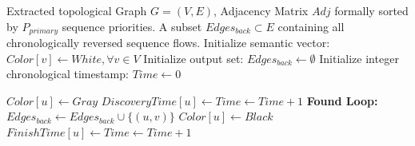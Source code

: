 \documentclass[fleqn,10pt]{wlscirep}
\begin{document}
\begin{algorithm}[H]
\caption{Algorithmic Topological State Vector Cycle Classification}
\begin{algorithmic}[1]
\Require Extracted topological Graph $G=(V, E)$, Adjacency Matrix $Adj$ formally sorted by $P_{primary}$ sequence priorities.
\Ensure A subset $Edges_{back} \subset E$ containing all chronologically reversed sequence flows.
\State Initialize semantic vector: $Color[v] \gets White, \forall v \in V$
\State Initialize output set: $Edges_{back} \gets \emptyset$
\State Initialize integer chronological timestamp: $Time \gets 0$

    \State $Color[u] \gets Gray$  
    \State $DiscoveryTime[u] \gets Time \gets Time + 1$
            \State \textbf{Found Loop:} 
            \State $Edges_{back} \gets Edges_{back} \cup \{(u, v)\}$ 
            \State {} 
        \EndIf
        \State {}
    \EndFor
    \State $Color[u] \gets Black$ 
    \State $FinishTime[u] \gets Time \gets Time + 1$
\EndFunction
\end{algorithmic}
\label{alg:dfs}
\end{algorithm}
\end{document}
